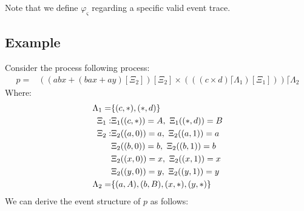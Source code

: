 \documentclass{article}
\begin{document}
Note that we define $\varphi_{\varsigma}$ regarding a specific valid event trace.

\subsection{Example}
Consider the process following process:
\begin{align*}
    p = & \left(
        \left( 
            abx + 
            \left( bax + ay \right) [\Xi_2]
        \right)[\Xi_2] \times 
        \left(
            \left(
                \left( c \times d \right)\lceil \Lambda_1
            \right)[\Xi_1]
        \right)
    \right)\lceil \Lambda_2 
\end{align*}
Where:
\begin{align*}
    \Lambda_1 = & \{(c, *), (*, d)\} \\
    \Xi_1: & \Xi_1((c,*)) = A,\ \Xi_1((*, d)) = B \\
    \Xi_2: & \Xi_2((a,0)) = a,\ \Xi_2((a, 1)) = a \\
           & \Xi_2((b,0)) = b,\ \Xi_2((b, 1)) = b \\
           & \Xi_2((x,0)) = x,\ \Xi_2((x, 1)) = x \\
           & \Xi_2((y,0)) = y,\ \Xi_2((y, 1)) = y \\
    \Lambda_2 = & \{(a, A), (b, B), (x, *), (y, *)\} \\
\end{align*}
We can derive the event structure of $p$ as follows:
\end{document}
